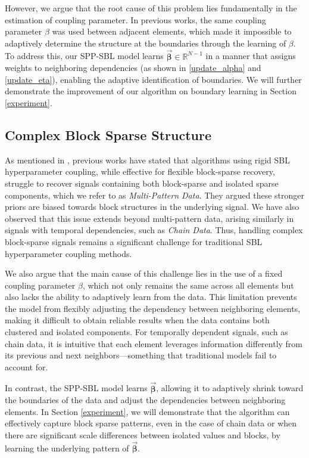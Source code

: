 \documentclass[lettersize,journal]{IEEEtran}
\theoremstyle{remark}
\begin{document}
However, we argue that the root cause of this problem lies fundamentally in the estimation of coupling parameter. In previous works, the same coupling parameter \( \beta \) was used between adjacent elements, which made it impossible to adaptively determine the structure at the boundaries through the learning of \( \beta \). 
To address this, our SPP-SBL model learns \( \vec{\boldsymbol{\beta}} \in \mathbb{R}^{N-1} \) in a manner that assigns weights to neighboring dependencies (as shown in \eqref{update_alpha} and \eqref{update_eta}), enabling the adaptive identification of boundaries. We will further demonstrate the improvement of our algorithm on boundary learning in Section \ref{experiment}.


\subsection{Complex Block Sparse Structure} \label{subsec:complex}

As mentioned in  \cite{sant2022block}, previous works have stated that algorithms using rigid SBL hyperparameter coupling, while effective for flexible block-sparse recovery, struggle to recover signals containing both block-sparse and isolated sparse components, which we refer to as \textit{Multi-Pattern Data}. They argued these stronger priors are biased towards block structures in the underlying signal. We have also observed that this issue extends beyond multi-pattern data, arising similarly in signals with temporal dependencies, such as \textit{Chain Data}. Thus, handling complex block-sparse signals remains a significant challenge for traditional SBL hyperparameter coupling methods.


We also argue that the main cause of this challenge lies in the use of a fixed coupling parameter \( \beta \), which not only remains the same across all elements but also lacks the ability to adaptively learn from the data. This limitation prevents the model from flexibly adjusting the dependency between neighboring elements, making it difficult to obtain reliable results when the data contains both clustered and isolated components. For temporally dependent signals, such as chain data, it is intuitive that each element leverages information differently from its previous and next neighbors—something that traditional models fail to account for.

In contrast, the SPP-SBL model learns \( \vec{\boldsymbol{\beta}} \), allowing it to adaptively shrink toward the boundaries of the data and adjust the dependencies between neighboring elements. In Section \ref{experiment}, we will demonstrate that the algorithm can effectively capture block sparse patterns, even in the case of chain data or when there are significant scale differences between isolated values and blocks, by learning the underlying pattern of \( \vec{\boldsymbol{\beta}} \).
\end{document}
